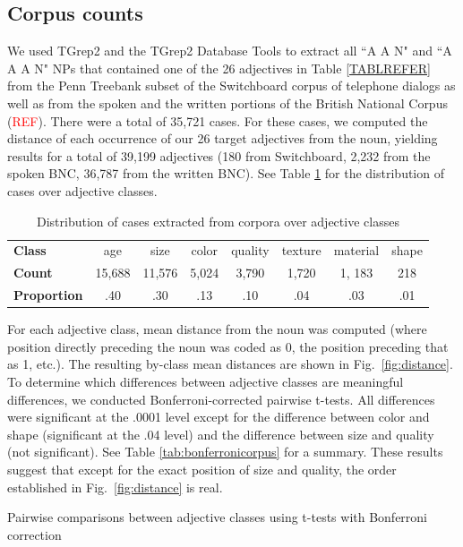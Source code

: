 \documentclass{pnastwo}
\newcommand{\tableref}[1]{Table \ref{#1}}
\newcommand{\figref}[1]{Fig.~\ref{#1}}
\newcommand{\red}[1]{\textcolor{Red}{#1}}
\begin{document}
\begin{article}
\newpage

\begin{materials}
\section{Corpus counts} 

We used TGrep2 \cite{rohde2005} and the TGrep2 Database Tools \cite{degenjaeger-tdt} to extract all ``A A N" and ``A A A N" NPs that contained one of the 26 adjectives in Table \ref{TABLREFER} from the Penn Treebank subset of the Switchboard corpus of telephone dialogs \cite{godfrey1992} as well as from the spoken and the written portions of the British National Corpus (\red{REF}). There were a total of 35,721 cases. For these cases, we computed the distance of each occurrence of our 26 target adjectives from the noun, yielding results for a total of 39,199 adjectives (180 from Switchboard, 2,232 from the spoken BNC, 36,787 from the written BNC).  See \tableref{tab:adjdist} for the distribution of cases over adjective classes.

\begin{table}
	\caption{Distribution of cases extracted from corpora over adjective classes}
	\begin{tabular}{l c c c c c c c}
	\textbf{Class} & age & size & color & quality & texture & material & shape \\
	\textbf{Count} & 15,688 & 11,576 & 5,024 & 3,790 & 1,720 & 1, 183 & 218 \\
	\textbf{Proportion} & .40 & .30 & .13 & .10 & .04 & .03 & .01
	\end{tabular}
\label{tab:adjdist}
\end{table}


For each adjective class, mean distance from the noun was computed (where position directly preceding the noun was coded as 0, the position preceding that as 1, etc.). The resulting by-class mean distances are shown in \figref{fig:distance}. To determine which differences between adjective classes are meaningful differences, we conducted Bonferroni-corrected pairwise t-tests. All differences were significant at the .0001 level except for the difference between color and shape (significant at the .04 level) and the difference between size and quality (not significant). See \tableref{tab:bonferronicorpus} for a summary. These results suggest that except for the exact position of size and quality, the order established in \figref{fig:distance} is real.

\begin{table}
\caption{Pairwise comparisons between adjective classes using t-tests with Bonferroni correction}


\end{table}
\end{materials}
\end{article}
\end{document}
